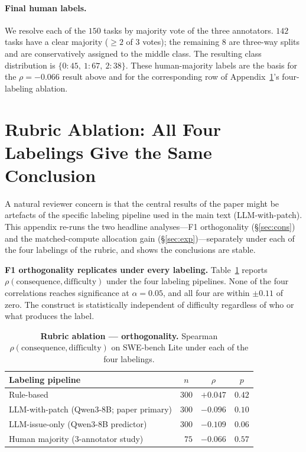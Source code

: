 \documentclass{article}
\begin{document}
\paragraph{Final human labels.} We resolve each of the $150$ tasks by
majority vote of the three annotators. $142$ tasks have a clear
majority ($\geq 2$ of $3$ votes); the remaining $8$ are three-way
splits and are conservatively assigned to the middle class. The
resulting class distribution is $\{0{:}45,\ 1{:}67,\ 2{:}38\}$. These
human-majority labels are the basis for the $\rho = -0.066$ result
above and for the corresponding row of Appendix~\ref{app:rubric}'s
four-labeling ablation.

\section{Rubric Ablation: All Four Labelings Give the Same Conclusion}
\label{app:rubric}

A natural reviewer concern is that the central results of the paper
might be artefacts of the specific labeling pipeline used in the main
text (LLM-with-patch). This appendix re-runs the two headline
analyses---F1 orthogonality (\S\ref{sec:cons}) and the matched-compute
allocation gain (\S\ref{sec:exp})---separately under each of the four
labelings of the rubric, and shows the conclusions are stable.

\textbf{F1 orthogonality replicates under every labeling.}
Table~\ref{tab:abl-ortho} reports $\rho(\mathrm{consequence}, \mathrm{difficulty})$
under the four labeling pipelines. None of the four correlations
reaches significance at $\alpha = 0.05$, and all four are within
$\pm 0.11$ of zero. The construct is statistically independent of
difficulty regardless of who or what produces the label.

\begin{table}[h]
\centering
\caption{\textbf{Rubric ablation — orthogonality.} Spearman
$\rho(\mathrm{consequence}, \mathrm{difficulty})$ on SWE-bench Lite
under each of the four labelings.}
\label{tab:abl-ortho}
\small
\begin{tabular}{lccc}
\toprule
Labeling pipeline & $n$ & $\rho$ & $p$ \\
\midrule
Rule-based                                  & $300$ & $+0.047$ & $0.42$ \\
LLM-with-patch  (Qwen3-8B; paper primary)   & $300$ & $-0.096$ & $0.10$ \\
LLM-issue-only  (Qwen3-8B predictor)        & $300$ & $-0.109$ & $0.06$ \\
Human majority  (3-annotator study)         & $\phantom{0}75$  & $-0.066$ & $0.57$ \\
\bottomrule
\end{tabular}
\end{table}
\end{document}
